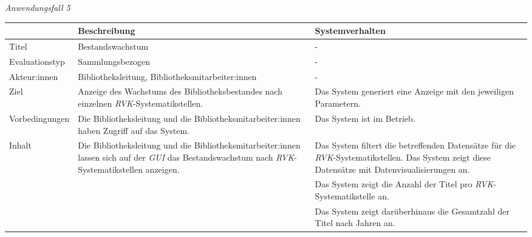 \newpage
\noindent
\textit{Anwendungsfall 5}

\begingroup
\setlength{\tabcolsep}{10pt} %
\renewcommand{\arraystretch}{1.25} 
\begin{table}[h]
    \centering
    \begin{adjustbox}{max width=\textwidth}
    \begin{tabular}{lp{7.0cm}p{7.0cm}}
       \toprule
       \textbf{}          & \textbf{Beschreibung} &\textbf{Systemverhalten}\\
       \midrule
        Titel                            &Bestandswachstum& -\\
        Evaluationstyp                   &Sammlungsbezogen                   & -\\
        Akteur:innen                     &Bibliotheksleitung, Bibliotheksmitarbeiter:innen& -\\
        Ziel                             &Anzeige des Wachstums des Bibliotheksbestandes nach einzelnen \textit{\acrshort{RVK}}-Systematikstellen.& Das System generiert eine Anzeige mit den jeweiligen Parametern.\\
        Vorbedingungen                   &Die Bibliotheksleitung und die Bibliotheksmitarbeiter:innen haben Zugriff auf das System.& Das System ist im Betrieb.\\
        Inhalt                           &Die Bibliotheksleitung und die Bibliotheksmitarbeiter:innen lassen sich auf der \textit{\acrshort{GUI}} das Bestandswachstum nach  \textit{\acrshort{RVK}}-Systematikstellen anzeigen.& Das System filtert die betreffenden Datensätze für die  \textit{\acrshort{RVK}}-Systematikstellen. Das System zeigt diese Datensätze mit Datenvisualisierungen an.\\
                                         & &Das System zeigt die Anzahl der Titel pro \textit{\acrshort{RVK}}-Systematikstelle an.\\
                                         & &Das System zeigt darüberhinaus die Gesamtzahl der Titel nach Jahren an.\\

\end{tabular}
\end{adjustbox}
\end{table}

